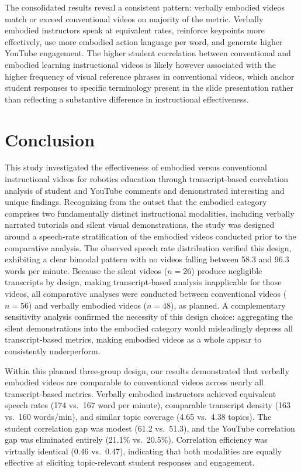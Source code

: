 \documentclass[fleqn,10pt]{JLA_article} %
\begin{document}
The consolidated results reveal a consistent pattern: verbally embodied videos match or exceed conventional videos on majority of the metric. Verbally embodied instructors speak at equivalent rates, reinforce keypoints more effectively, use more embodied action language per word, and generate higher YouTube engagement. The higher student correlation between conventional and embodied learning instructional videos is likely however associated with the higher frequency of visual reference phrases in conventional videos, which anchor student responses to specific terminology present in the slide presentation rather than reflecting a substantive difference in instructional effectiveness.


\section{Conclusion}

This study investigated the effectiveness of embodied versus conventional instructional videos for robotics education through transcript-based correlation analysis of student and YouTube comments and demonstrated interesting and unique findings. Recognizing from the outset that the embodied category comprises two fundamentally distinct instructional modalities, including verbally narrated tutorials and silent visual demonstrations, the study was designed around a speech-rate stratification of the embodied videos conducted prior to the comparative analysis. The observed speech rate distribution verified this design, exhibiting a clear bimodal pattern with no videos falling between 58.3 and 96.3 words per minute. Because the silent videos ($n = 26$) produce negligible transcripts by design, making transcript-based analysis inapplicable for those videos, all comparative analyses were conducted between conventional videos ($n = 56$) and verbally embodied videos ($n = 48$), as planned. A complementary sensitivity analysis confirmed the necessity of this design choice: aggregating the silent demonstrations into the embodied category would misleadingly depress all transcript-based metrics, making embodied videos as a whole appear to consistently underperform.

Within this planned three-group design, our results demonstrated that verbally embodied videos are comparable to conventional videos across nearly all transcript-based metrics. Verbally embodied instructors achieved equivalent speech rates (174 vs.\ 167 word per minute), comparable transcript density (163 vs.\ 160 words/min), and similar topic coverage (4.65 vs.\ 4.38 topics). The student correlation gap was modest (61.2 vs.\ 51.3), and the YouTube correlation gap was eliminated entirely (21.1\% vs.\ 20.5\%). Correlation efficiency was virtually identical (0.46 vs.\ 0.47), indicating that both modalities are equally effective at eliciting topic-relevant student responses and engagement.
\end{document}
